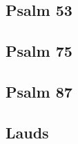 \documentclass[12pt, a5paper]{book}
\begin{document}




\subsection{Psalm 53}










\subsection{Psalm 75}









\subsection{Psalm 87}

















%

\begin {center}\end{center}

\pagebreak


\subsection{Lauds}
\end{document}
